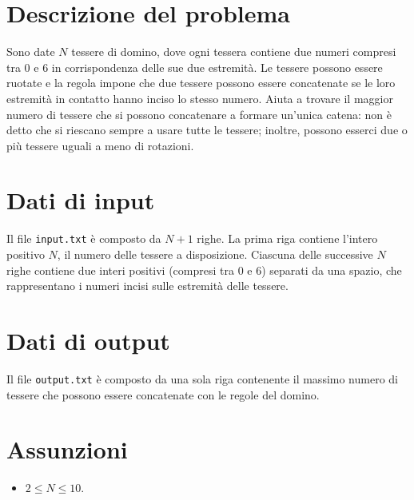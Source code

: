 \documentclass[a4paper,11pt]{article}
\begin{document}
\vspace{0.5cm}


\vspace{0.5cm}

\section*{Descrizione del problema}

Sono date $N$ tessere di domino, dove ogni tessera
contiene due numeri compresi tra $0$ e $6$ in corrispondenza delle sue due
estremità. Le tessere possono essere ruotate e la regola impone
che due tessere possono essere concatenate se le loro estremità
in contatto hanno inciso lo stesso numero. Aiuta a trovare il maggior
numero di tessere che si possono concatenare a formare un'unica
catena: non è detto che si riescano sempre a usare tutte le
tessere; inoltre, possono esserci due o più tessere uguali a
meno di rotazioni.


\section*{Dati di input}

Il file \texttt{input.txt} è composto da $N+1$
righe.  La prima riga contiene l'intero positivo $N$, il
numero delle tessere a disposizione. Ciascuna delle
successive $N$ righe contiene due interi positivi (compresi tra $0$ e $6$) separati da
una spazio, che rappresentano i numeri incisi sulle estremità
delle tessere.


\section*{Dati di output}

Il file \texttt{output.txt} è composto da una sola riga
contenente il massimo numero di tessere che possono essere concatenate
con le regole del domino.

\section*{Assunzioni}

\begin{itemize}
  \item $2 ≤ N ≤ 10$.
\end{itemize}
\end{document}
